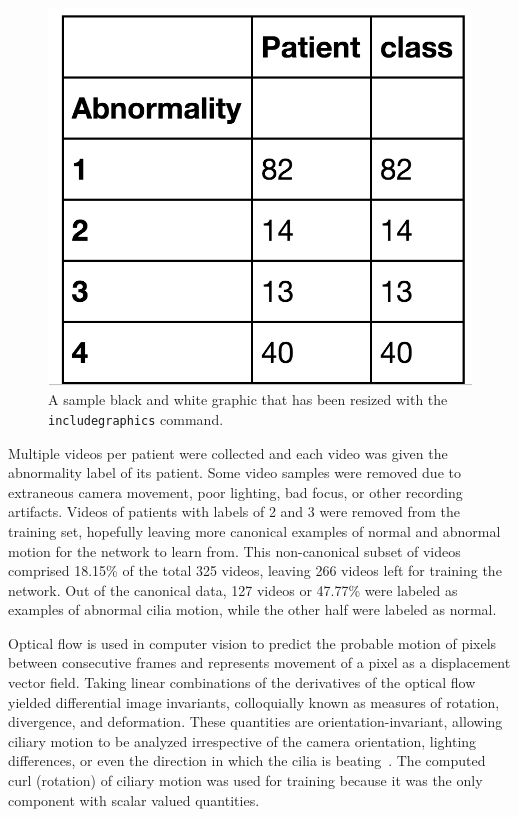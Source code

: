 \begin{figure}[H]
\includegraphics[scale=0.5]{patient_label}
\caption{A sample black and white graphic that has
been resized with the \texttt{includegraphics} command.}
\end{figure}

Multiple videos per patient were collected and each video was given the abnormality label of its patient. Some video samples were removed due to extraneous camera movement, poor lighting, bad focus, or other recording artifacts. Videos of patients with labels of 2 and 3 were removed from the training set, hopefully leaving more canonical examples of normal and abnormal motion for the network to learn from. This non-canonical subset of videos comprised 18.15\% of  the total 325 videos, leaving 266 videos left for training the network. Out of the canonical data, 127 videos or 47.77\% were labeled as examples of abnormal cilia motion, while the other half were labeled as normal.
 
Optical flow is used in computer vision to predict the probable motion of pixels between consecutive frames and represents movement of a pixel as a displacement vector field. Taking linear combinations of the derivatives of the optical flow yielded differential image invariants, colloquially known as measures of rotation, divergence, and deformation. These quantities are orientation-invariant, allowing ciliary motion to be analyzed irrespective of the camera orientation, lighting differences, or even the direction in which the cilia is beating~\cite{quinn2015automated}. The computed curl (rotation) of ciliary motion was used for training because it was the only component with scalar valued quantities. 
 
